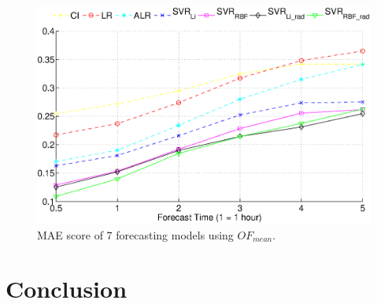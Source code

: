 \documentclass[conference]{IEEEtran}
\begin{document}





\begin{figure}[tb]
\centering
\includegraphics[width=3 in]{pics/predmae}
\caption{MAE score of 7 forecasting models using $OF_{mean}$.}
\label{fig:modelsmae_pre}
\end{figure}


\section{Conclusion} %
\label{sec:conclusion}
\end{document}
